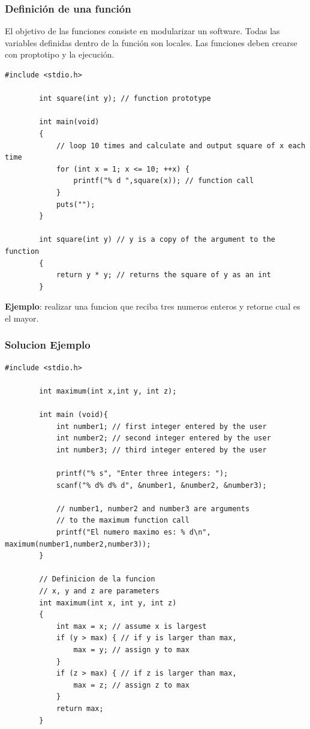 \documentclass[10.5pt,scale=1.0,t,aspectratio=169,hyperref={pdfpagelabels=false}]{beamer}
\begin{document}
\begin{frame}[fragile]
	\frametitle{Definición de una función}
	El objetivo de las funciones consiste en modularizar un software. Todas las variables definidas dentro de la función son locales. Las funciones deben crearse con proptotipo y la ejecución.
	\begin{lstlisting}[style=CStyle]
		#include <stdio.h>
		
		int square(int y); // function prototype
		
		int main(void)
		{
			// loop 10 times and calculate and output square of x each time
			for (int x = 1; x <= 10; ++x) {
				printf("% d ",square(x)); // function call
			}
			puts("");
		}
		
		int square(int y) // y is a copy of the argument to the function
		{
			return y * y; // returns the square of y as an int
		}
	\end{lstlisting}
	\textbf{Ejemplo}: realizar una funcion que reciba tres numeros enteros y retorne cual es el mayor. 
\end{frame}

\begin{frame}[fragile]
	\frametitle{Solucion Ejemplo}
	\begin{lstlisting}[style=CStyle]
		#include <stdio.h>
		
		int maximum(int x,int y, int z);
		
		int main (void){
			int number1; // first integer entered by the user
			int number2; // second integer entered by the user
			int number3; // third integer entered by the user
			
			printf("% s", "Enter three integers: ");
			scanf("% d% d% d", &number1, &number2, &number3);
			
			// number1, number2 and number3 are arguments
			// to the maximum function call
			printf("El numero maximo es: % d\n", maximum(number1,number2,number3));
		}
		
		// Definicion de la funcion
		// x, y and z are parameters
		int maximum(int x, int y, int z)
		{
			int max = x; // assume x is largest
			if (y > max) { // if y is larger than max,
				max = y; // assign y to max
			}
			if (z > max) { // if z is larger than max,
				max = z; // assign z to max
			}
			return max;
		}
	\end{lstlisting}
\end{frame}
\end{document}
